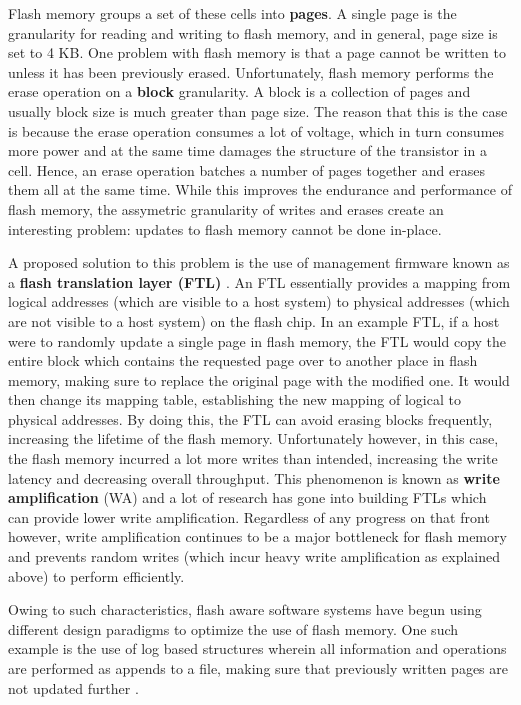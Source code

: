 \documentclass[10pt, author, twocolumn]{article}
\begin{document}
Flash memory groups a set of these cells into \textbf{pages}. A single page is the granularity for reading and writing to flash memory, and in general, page size is set to 4 KB. One problem with flash memory is that a page cannot be written to unless it has been previously erased. Unfortunately, flash memory performs the erase operation on a \textbf{block} granularity. A block is a collection of pages and usually block size is much greater than page size. The reason that this is the case is because the erase operation consumes a lot of voltage, which in turn consumes more power and at the same time damages the structure of the transistor in a cell. Hence, an erase operation batches a number of pages together and erases them all at the same time. While this improves the endurance and performance of flash memory, the assymetric granularity of writes and erases create an interesting problem: updates to flash memory cannot be done in-place.

A proposed solution to this problem is the use of management firmware known as a \textbf{flash translation layer (FTL)} \cite{kim2002space}. An FTL essentially provides a mapping from logical addresses (which are visible to a host system) to physical addresses (which are not visible to a host system) on the flash chip. In an example FTL, if a host were to randomly update a single page in flash memory, the FTL would copy the entire block which contains the requested page over to another place in flash memory, making sure to replace the original page with the modified one. It would then change its mapping table, establishing the new mapping of logical to physical addresses. By doing this, the FTL can avoid erasing blocks frequently, increasing the lifetime of the flash memory. Unfortunately however, in this case, the flash memory incurred a lot more writes than intended, increasing the write latency and decreasing overall throughput. This phenomenon is known as \textbf{write amplification} (WA) and a lot of research has gone into building FTLs which can provide lower write amplification. Regardless of any progress on that front however, write amplification continues to be a major bottleneck for flash memory and prevents random writes (which incur heavy write amplification as explained above) to perform efficiently.

Owing to such characteristics, flash aware software systems have begun using different design paradigms to optimize the use of flash memory. One such example is the use of log based structures wherein all information and operations are performed as appends to a file, making sure that previously written pages are not updated further \cite{rosenblum1992design}. 
\end{document}
